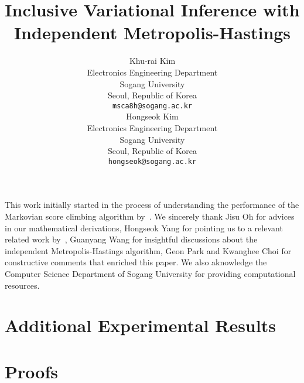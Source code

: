 \documentclass{article}
\title{Inclusive Variational Inference with \\ Independent Metropolis-Hastings}
\author{%
  Khu-rai Kim \\
  Electronics Engineering Department \\
  Sogang University\\
  Seoul, Republic of Korea \\
  \texttt{msca8h@sogang.ac.kr} \\
  \And
  Hongseok Kim \\
  Electronics Engineering Department \\
  Sogang University\\
  Seoul, Republic of Korea \\
  \texttt{hongseok@sogang.ac.kr} \\
}
\begin{document}
\maketitle

\begin{abstract}
  
\end{abstract}







\newpage

\begin{ack}
  This work initially started in the process of understanding the performance of the Markovian score climbing algorithm by~\citet{NEURIPS2020_b2070693}.
  We sincerely thank Jisu Oh for advices in our mathematical derivations, Hongseok Yang for pointing us to a relevant related work by~\citet{kim2021adaptive}, Guanyang Wang for insightful discussions about the independent Metropolis-Hastings algorithm, Geon Park and Kwanghee Choi for constructive comments that enriched this paper.
  We also aknowledge the Computer Science Department of Sogang University for providing computational resources.
\end{ack}




\newpage
\appendix
\section{Additional Experimental Results}



\section{Proofs}

\printProofs
\end{document}
